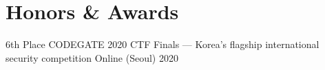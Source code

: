 \section{Honors \& Awards}
\begin{cvhonors}

\cvhonor
{6th Place} %
{CODEGATE 2020 CTF Finals --- Korea's flagship international security competition} %
{Online (Seoul)} %
{2020} %

\end{cvhonors}